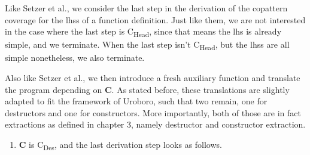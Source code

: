 \begin{algorithm}

Like Setzer et al., we consider the last step in the derivation of the copattern coverage for the lhss of a function definition. Just like them, we are not interested in the case where the last step is C\textsubscript{Head}, since that means the lhs is already simple, and we terminate. When the last step isn't C\textsubscript{Head}, but the lhss are all simple nonetheless, we also terminate.

\begin{prooftree}
\end{prooftree}

Also like Setzer et al., we then introduce a fresh auxiliary function and translate the program depending on \textbf{C}. As stated before, these translations are slightly adapted to fit the framework of Uroboro, such that two remain, one for destructors and one for constructors. More importantly, both of those are in fact extractions as defined in chapter 3, namely destructor and constructor extraction. 

\begin{enumerate}
\item \textbf{C} is C\textsubscript{Des}, and the last derivation step looks as follows.

\begin{prooftree}
\end{prooftree}


\end{enumerate}
\end{algorithm}
